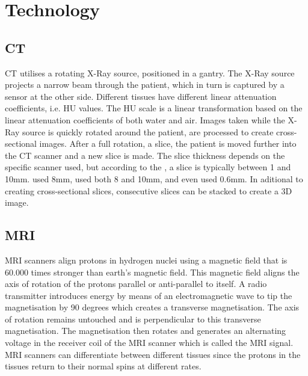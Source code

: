 \section{Technology}
\subsection{CT}
\ac{CT} utilises a rotating X-Ray source, positioned in a gantry. The X-Ray source projects a narrow beam through the patient, which in turn is captured by a sensor at the other side. Different tissues have different linear attenuation coefficients, i.e. \ac{HU} values. The \ac{HU} scale is a linear transformation based on the linear attenuation coefficients of both water and air. Images taken while the X-Ray source is quickly rotated around the patient, are processed to create cross-sectional images. After a full rotation, a slice, the patient is moved further into the \ac{CT} scanner and a new slice is made. The slice thickness depends on the specific scanner used, but according to the \cite{CTscan2016}, a slice is typically between 1 and 10mm. \cite{suzuki2017quantitative} used 8mm, \cite{mathys2012phantom} used both 8 and 10mm, and \cite{otton2013direct} even used 0.6mm. In aditional to creating cross-sectional slices, consecutive slices can be stacked to create a 3D image. 

\subsection{MRI}
\ac{MRI} scanners align protons in hydrogen nuclei using a magnetic field that is 60.000 times stronger than earth's magnetic field. This magnetic field aligns the axis of rotation of the protons parallel or anti-parallel to itself. A radio transmitter introduces energy by means of an electromagnetic wave to tip the magnetisation by 90 degrees which creates a transverse magnetisation. The axis of rotation remains untouched and is perpendicular to this transverse magnetisation. The magnetisation then rotates and generates an alternating voltage in the receiver coil of the \ac{MRI} scanner which is called the \acs{MRI} signal\citep{weishaupt2008does}. \ac{MRI} scanners can differentiate between different tissues since the protons in the tissues return to their normal spins at different rates\citep{MRIscan2017}.

